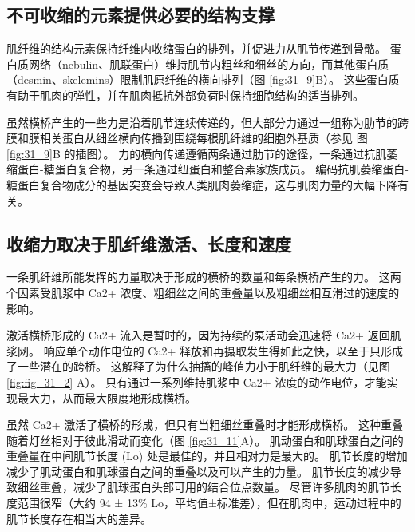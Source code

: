 \subsection{不可收缩的元素提供必要的结构支撑}

肌纤维的结构元素保持纤维内收缩蛋白的排列，并促进力从肌节传递到骨骼。
蛋白质网络（nebulin、肌联蛋白）维持肌节内粗丝和细丝的方向，而其他蛋白质（desmin、skelemins）限制肌原纤维的横向排列（图 \ref{fig:31_9}B）。
这些蛋白质有助于肌肉的弹性，并在肌肉抵抗外部负荷时保持细胞结构的适当排列。


虽然横桥产生的一些力是沿着肌节连续传递的，但大部分力通过一组称为肋节的跨膜和膜相关蛋白从细丝横向传播到围绕每根肌纤维的细胞外基质（参见 图 \ref{fig:31_9}B 的插图）。
力的横向传递遵循两条通过肋节的途径，一条通过抗肌萎缩蛋白-糖蛋白复合物，另一条通过纽蛋白和整合素家族成员。
编码抗肌萎缩蛋白-糖蛋白复合物成分的基因突变会导致人类肌肉萎缩症，这与肌肉力量的大幅下降有关。


\subsection{收缩力取决于肌纤维激活、长度和速度}

一条肌纤维所能发挥的力量取决于形成的横桥的数量和每条横桥产生的力。
这两个因素受肌浆中 Ca2+ 浓度、粗细丝之间的重叠量以及粗细丝相互滑过的速度的影响。


激活横桥形成的 Ca2+ 流入是暂时的，因为持续的泵活动会迅速将 Ca2+ 返回肌浆网。
响应单个动作电位的 Ca2+ 释放和再摄取发生得如此之快，以至于只形成了一些潜在的跨桥。
这解释了为什么抽搐的峰值力小于肌纤维的最大力（见图 \ref{fig:fig_31_2} A）。
只有通过一系列维持肌浆中 Ca2+ 浓度的动作电位，才能实现最大力，从而最大限度地形成横桥。


虽然 Ca2+ 激活了横桥的形成，但只有当粗细丝重叠时才能形成横桥。
这种重叠随着灯丝相对于彼此滑动而变化（图 \ref{fig:31_11}A）。 
肌动蛋白和肌球蛋白之间的重叠量在中间肌节长度 (Lo) 处是最佳的，并且相对力是最大的。
肌节长度的增加减少了肌动蛋白和肌球蛋白之间的重叠以及可以产生的力量。
肌节长度的减少导致细丝重叠，减少了肌球蛋白头部可用的结合位点数量。
尽管许多肌肉的肌节长度范围很窄（大约 94 ± 13\% Lo，平均值±标准差），但在肌肉中，运动过程中的肌节长度存在相当大的差异。


